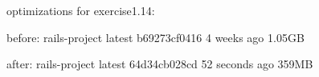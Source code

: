 optimizations for exercise1.14:

before:
rails-project                              latest              b69273cf0416        4 weeks ago         1.05GB

after:
rails-project                              latest              64d34cb028cd        52 seconds ago      359MB



